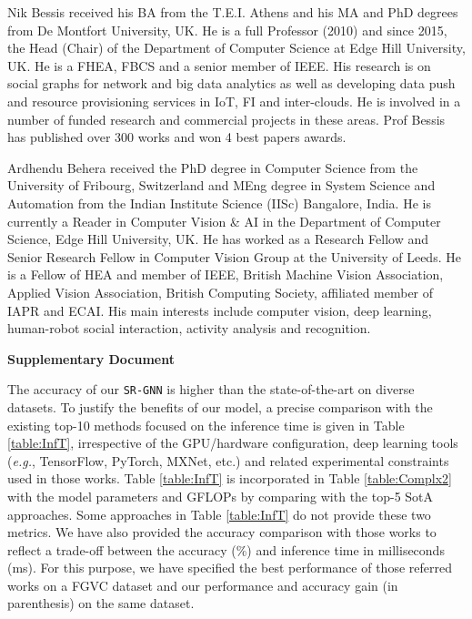 \documentclass[journal]{IEEEtran}
\begin{document}
\vspace{-10mm}
\begin{IEEEbiography}{Nik Bessis} received his BA from the T.E.I. Athens and his MA and PhD degrees from De Montfort University, UK. He is a full Professor (2010) and since 2015, the Head (Chair) of the Department of Computer Science at Edge Hill University, UK. He is a FHEA, FBCS and a senior member of IEEE. His research is on social graphs for network and big data analytics as well as developing data push and resource provisioning services in IoT, FI and inter-clouds. He is involved in a number of funded research and commercial projects in these areas. Prof Bessis has published over 300 works and won 4 best papers awards.
\end{IEEEbiography}
\vspace{-10mm}
\begin{IEEEbiography}{Ardhendu Behera} received the PhD degree in Computer Science from the University of Fribourg, Switzerland and MEng degree in System Science and Automation from the Indian Institute Science (IISc) Bangalore, India. He is currently a Reader in Computer Vision \& AI in the Department of Computer Science, Edge Hill University, UK. He has worked as a Research Fellow and Senior Research Fellow in Computer Vision Group at the University of Leeds. He is a Fellow of HEA and member of {IEEE}, British Machine Vision Association, Applied Vision Association, British Computing Society, affiliated member of IAPR and ECAI. His main interests include computer vision, deep learning, human-robot social interaction, activity analysis and recognition.
\end{IEEEbiography}

\clearpage
\begin{center}
\Large
\textbf{ Supplementary Document}
\large
\end{center}
\vspace{ 0.5 cm}
The accuracy of our \texttt{SR-GNN} is higher than the state-of-the-art on diverse datasets. To justify the benefits of our model, a precise comparison with the existing top-10 methods focused on the inference time is given in Table \ref{table:InfT}, irrespective of the GPU/hardware configuration, deep learning tools (\textit{e.g.}, TensorFlow, PyTorch, MXNet, etc.) and related experimental constraints used in those works. Table \ref{table:InfT} is incorporated in Table \ref{table:Complx2} with the model parameters and GFLOPs by comparing with the top-5 SotA approaches. Some approaches in Table \ref{table:InfT} do not provide these two metrics. We have also provided the accuracy comparison with those works to reflect a trade-off between the accuracy (\%) and inference time in milliseconds (ms). For this purpose, we have specified the best performance of those referred works on a FGVC dataset and our performance and accuracy gain (in parenthesis) on the same dataset.
\end{document}
